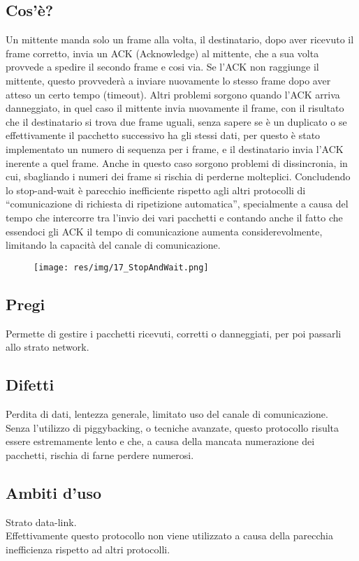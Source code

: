 \subsection{Cos'è?}
Un mittente manda solo un frame alla volta, il destinatario, dopo aver ricevuto il frame corretto, invia un ACK (Acknowledge) al mittente, che a sua volta provvede a spedire il secondo frame e cosi via. 
Se l'ACK non raggiunge il mittente, questo provvederà a inviare nuovamente lo stesso frame dopo aver atteso un certo tempo (timeout).
Altri problemi sorgono quando l'ACK arriva danneggiato, in quel caso il mittente invia nuovamente il frame, con il risultato che il destinatario si trova due frame uguali, senza sapere se è un duplicato o se effettivamente il pacchetto successivo ha gli stessi dati, per questo è stato implementato un numero di sequenza per i frame, e il destinatario invia l'ACK inerente a quel frame.
Anche in questo caso sorgono problemi di dissincronia, in cui, sbagliando i numeri dei frame si rischia di perderne molteplici.
Concludendo lo stop-and-wait è parecchio inefficiente rispetto agli altri protocolli di “comunicazione di richiesta di ripetizione automatica”, specialmente a causa del tempo che intercorre tra l'invio dei vari pacchetti e contando anche il fatto che essendoci gli ACK il tempo di comunicazione aumenta considerevolmente, limitando la capacità del canale di comunicazione.
 
\begin{figure}[H]
\centering
\texttt{[image: res/img/17\_StopAndWait.png]}
\end{figure}

\subsection{Pregi}
Permette di gestire i pacchetti ricevuti, corretti o danneggiati, per poi passarli allo strato network.

\subsection{Difetti}
Perdita di dati, lentezza generale, limitato uso del canale di comunicazione.\\
Senza l'utilizzo di piggybacking, o tecniche avanzate, questo protocollo risulta essere estremamente lento e che, a causa della mancata numerazione dei pacchetti, rischia di farne perdere numerosi.


\subsection{Ambiti d'uso}
Strato data-link.\\
Effettivamente questo protocollo non viene utilizzato a causa della parecchia inefficienza rispetto ad altri protocolli.


